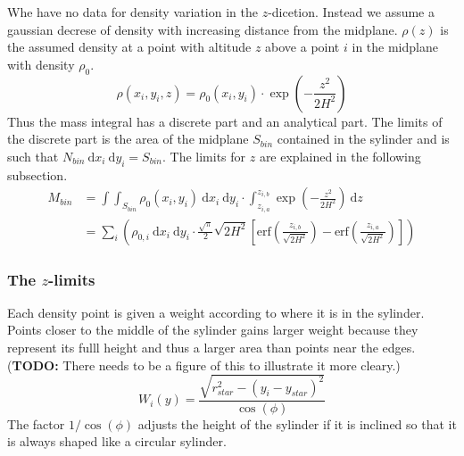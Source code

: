 \documentclass[a4paper, 12pt, english, titlepage]{article}
\newcommand{\erf}[1]{\textrm{erf}\left(#1\right)} %
\newcommand{\D}[1]{\ \mathrm{d}#1} %
\begin{document}
        Whe have no data for density variation in the $z$-dicetion. Instead we assume a gaussian decrese of density with increasing distance from the midplane. $\rho(z)$ is the assumed density at a point with altitude $z$ above a point $i$ in the midplane with density $\rho_0$.
        $$
        \rho(x_i, y_i, z) = \rho_0(x_i, y_i) \cdot \exp\left(- \frac{z^2}{2H^2}\right)
        $$
        Thus the mass integral has a discrete part and an analytical part. The limits of the discrete part is the area of the midplane $S_{bin}$ contained in the sylinder and is such that $N_{bin} \D{x_i}\D{y_i} = S_{bin}$. The limits for $z$ are explained in the following subsection.
        \begin{align*}
            M_{bin}
                &= \int\int_{S_{bin}} \rho_0(x_i,y_i) \D{x_i}\D{y_i} \cdot
                    \int_{z_{i,a}}^{z_{i,b}} \exp\left(- \frac{z^2}{2H^2}\right) \D{z} \\
                &= \sum_i \left(
                        \rho_{0,i} \D{x_i}\D{y_i} \cdot
                        \frac{\sqrt{\pi}}{2} \sqrt{2H^2}
                        \left[
                            \erf{\frac{z_{i,b}}{\sqrt{2H^2}}} -
                            \erf{\frac{z_{i,a}}{\sqrt{2H^2}}}
                        \right]
                    \right)
        \end{align*}

    \subsubsection{The $z$-limits}
        Each density point is given a weight according to where it is in the sylinder. Points closer to the middle of the sylinder gains larger weight because they represent its fulll height and thus a larger area than points near the edges.
        (\textbf{TODO:} There needs to be a figure of this to illustrate it more cleary.)
        $$
        W_i(y) = \frac{\sqrt{r_{star}^2 - (y_i - y_{star})^2}}{\cos(\phi)}
        $$
        The factor $1/\cos(\phi)$ adjusts the height of the sylinder if it is inclined so that it is always shaped like a circular sylinder.
\end{document}
